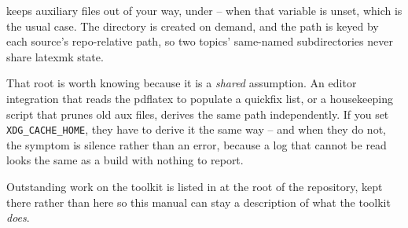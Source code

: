  keeps auxiliary files out of your way, under
 --  when that
variable is unset, which is the usual case. The directory is created on
demand, and the path is keyed by each source's repo-relative path, so two
topics' same-named subdirectories never share latexmk state.

That root is worth knowing because it is a \emph{shared} assumption. An
editor integration that reads the pdflatex  to populate a
quickfix list, or a housekeeping script that prunes old aux files, derives
the same path independently. If you set \texttt{XDG\_CACHE\_HOME}, they
have to derive it the same way -- and when they do not, the symptom is
silence rather than an error, because a log that cannot be read looks the
same as a build with nothing to report.

Outstanding work on the toolkit is listed in  at the root of
the repository, kept there rather than here so this manual can stay a
description of what the toolkit \emph{does}.
